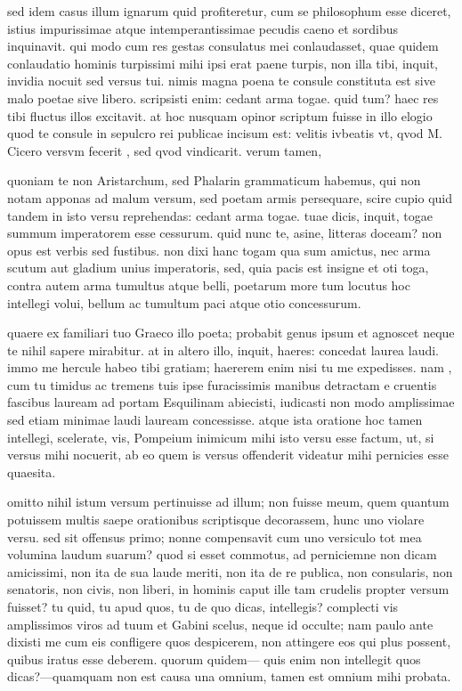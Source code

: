  sed idem casus illum ignarum quid profiteretur, cum se philosophum esse diceret, istius impurissimae atque intemperantissimae pecudis caeno et sordibus inquinavit. qui modo cum res gestas consulatus mei conlaudasset, quae quidem conlaudatio hominis turpissimi mihi ipsi erat paene turpis, non illa tibi, inquit, invidia nocuit sed versus tui. nimis magna poena te consule constituta est sive malo poetae sive libero. scripsisti enim: cedant arma togae. quid tum? haec res tibi fluctus illos excitavit. at hoc nusquam opinor scriptum fuisse in illo elogio quod te consule in sepulcro rei publicae incisum est: velitis ivbeatis vt, qvod M. Cicero versvm fecerit , sed qvod vindicarit. verum tamen,

 quoniam te non Aristarchum, sed Phalarin grammaticum habemus, qui non notam apponas ad malum versum, sed poetam armis persequare, scire cupio quid tandem in isto versu reprehendas: cedant arma togae. tuae dicis, inquit, togae summum imperatorem esse cessurum. quid nunc te, asine, litteras doceam? non opus est verbis sed fustibus. non dixi hanc togam qua sum amictus, nec arma scutum aut gladium unius imperatoris, sed, quia pacis est insigne et oti toga, contra autem arma tumultus atque belli, poetarum more tum locutus hoc intellegi volui, bellum ac tumultum paci atque otio concessurum.

 quaere ex familiari tuo Graeco illo poeta; probabit genus ipsum et agnoscet neque te nihil sapere mirabitur. at in altero illo, inquit, haeres: concedat laurea laudi. immo me hercule habeo tibi gratiam; haererem enim nisi tu me expedisses. nam , cum tu timidus ac tremens tuis ipse furacissimis manibus detractam e cruentis fascibus lauream ad portam Esquilinam abiecisti, iudicasti non modo amplissimae sed etiam minimae laudi lauream concessisse. atque ista oratione hoc tamen intellegi, scelerate, vis, Pompeium inimicum mihi isto versu esse factum, ut, si versus mihi nocuerit, ab eo quem is versus offenderit videatur mihi pernicies esse quaesita.

 omitto nihil istum versum pertinuisse ad illum; non fuisse meum, quem quantum potuissem multis saepe orationibus scriptisque decorassem, hunc uno violare versu. sed sit offensus primo; nonne compensavit cum uno versiculo tot mea volumina laudum suarum? quod si esset commotus, ad perniciemne non dicam amicissimi, non ita de sua laude meriti, non ita de re publica, non consularis, non senatoris, non civis, non liberi, in hominis caput ille tam crudelis propter versum fuisset? tu quid, tu apud quos, tu de quo dicas, intellegis? complecti vis amplissimos viros ad tuum et Gabini scelus, neque id occulte; nam paulo ante dixisti me cum eis confligere quos despicerem, non attingere eos qui plus possent, quibus iratus esse deberem. quorum quidem— quis enim non intellegit quos dicas?—quamquam non est causa una omnium, tamen est omnium mihi probata.

